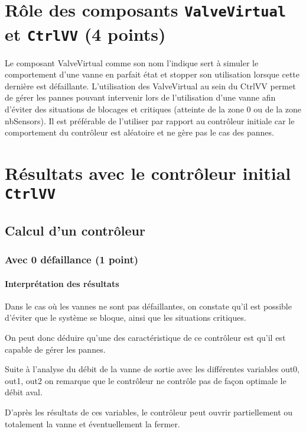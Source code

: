 \documentclass[a4paper]{book}
\begin{document}
\section{Rôle des composants {\tt ValveVirtual} et {\tt CtrlVV} (4 points)}
Le composant ValveVirtual comme son nom l'indique sert à simuler le comportement d'une vanne en parfait état et stopper son utilisation lorsque cette dernière est défaillante.
L'utilisation des ValveVirtual au sein du CtrlVV permet de gérer les pannes pouvant intervenir lors de l'utilisation d'une vanne afin d'éviter des situations de blocages et critiques (atteinte de la zone 0 ou de la zone nbSensors). Il est préférable de l'utiliser par rapport au contrôleur initiale car le comportement du contrôleur est aléatoire et ne gère pas le cas des pannes.    
   
\section{Résultats avec le contrôleur initial {\tt CtrlVV}}

\subsection{Calcul d'un contrôleur}

\subsubsection{Avec 0 défaillance (1 point)}





\paragraph{Interprétation des résultats}
Dans le cas où les vannes ne sont pas défaillantes, on constate qu'il est possible d'éviter que le système se bloque, ainsi que les situations critiques.

On peut donc déduire qu'une des caractéristique de ce contrôleur est qu'il est capable de gérer les pannes.

Suite à l'analyse du débit de la vanne de sortie avec les différentes variables out0, out1, out2 on remarque que le contrôleur ne contrôle pas de façon optimale le débit aval.

D'après les résultats de ces variables, le contrôleur peut ouvrir partiellement ou totalement la vanne et éventuellement la fermer.
\end{document}
